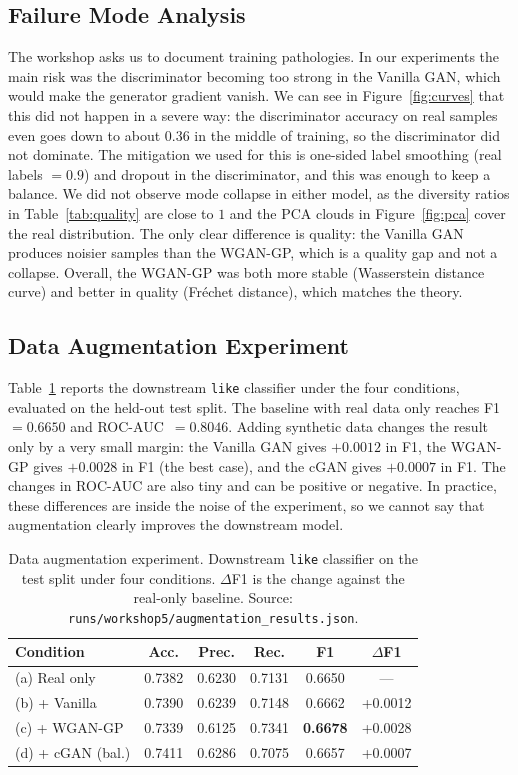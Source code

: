 \documentclass[10pt,twocolumn]{article}
\begin{document}
\subsection{Failure Mode Analysis}

The workshop asks us to document training pathologies. In our experiments the main risk was the
discriminator becoming too strong in the Vanilla GAN, which would make the generator gradient
vanish. We can see in Figure~\ref{fig:curves} that this did not happen in a severe way: the
discriminator accuracy on real samples even goes down to about $0.36$ in the middle of training,
so the discriminator did not dominate. The mitigation we used for this is one-sided label
smoothing (real labels $=0.9$) and dropout in the discriminator, and this was enough to keep a
balance. We did not observe mode collapse in either model, as the diversity ratios in
Table~\ref{tab:quality} are close to $1$ and the PCA clouds in Figure~\ref{fig:pca} cover the
real distribution. The only clear difference is quality: the Vanilla GAN produces noisier
samples than the WGAN-GP, which is a quality gap and not a collapse. Overall, the WGAN-GP was
both more stable (Wasserstein distance curve) and better in quality (Fr\'echet distance), which
matches the theory.

\subsection{Data Augmentation Experiment}

Table~\ref{tab:augment} reports the downstream \texttt{like} classifier under the four
conditions, evaluated on the held-out test split. The baseline with real data only reaches
F1~$=0.6650$ and ROC-AUC~$=0.8046$. Adding synthetic data changes the result only by a very
small margin: the Vanilla GAN gives $+0.0012$ in F1, the WGAN-GP gives $+0.0028$ in F1 (the best
case), and the cGAN gives $+0.0007$ in F1. The changes in ROC-AUC are also tiny and can be
positive or negative. In practice, these differences are inside the noise of the experiment, so
we cannot say that augmentation clearly improves the downstream model.

\begin{table}[t]
\centering
\caption{Data augmentation experiment. Downstream \texttt{like} classifier on the test split
under four conditions. $\Delta$F1 is the change against the real-only baseline. Source:
\texttt{runs/workshop5/augmentation\_results.json}.}
\label{tab:augment}
\small
\begin{tabular}{lccccc}
\toprule
Condition & Acc. & Prec. & Rec. & F1 & $\Delta$F1 \\
\midrule
(a) Real only        & 0.7382 & 0.6230 & 0.7131 & 0.6650 & --- \\
(b) + Vanilla        & 0.7390 & 0.6239 & 0.7148 & 0.6662 & +0.0012 \\
(c) + WGAN-GP        & 0.7339 & 0.6125 & 0.7341 & \textbf{0.6678} & +0.0028 \\
(d) + cGAN (bal.)    & 0.7411 & 0.6286 & 0.7075 & 0.6657 & +0.0007 \\
\bottomrule
\end{tabular}
\end{table}
\end{document}
